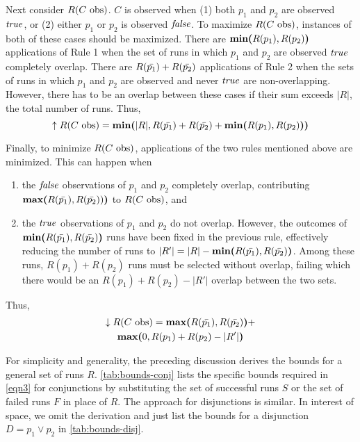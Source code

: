 Next consider $R(\text{$C$ obs})$.  $C$ is observed when (1) both $p_1$ and
$p_2$ are observed $\mathit{true}$, or (2) either $p_1$ or $p_2$ is observed
$\mathit{false}$.
To maximize $R(\text{$C$ obs})$, instances of both of these cases should be
maximized.
There are $\textbf{min(}R(p_1), R(p_2)\textbf{)}$ applications of Rule 1 when the set
of runs in which $p_1$ and $p_2$ are observed $\mathit{true}$ completely overlap.
There are $R(\text{$\bar{p_1}$}) + R(\text{$\bar{p_2}$})$ applications of Rule
2 when the sets of runs in which $p_1$ and $p_2$ are observed and never $\mathit{true}$ are
non-overlapping.
However, there has to be an overlap between these cases if their sum exceeds
$|R|$, the total number of runs.  Thus,
\begin{equation*}
  \uparrow R(\text{$C$ obs}) = \textbf{min(}|R|, R(\text{$\bar{p_1}$}) + R(\text{$\bar{p_2}$})
                   + \textbf{min(}R(p_1), R(p_2)\textbf{)}\textbf{)}
\end{equation*}

Finally, to minimize $R(\text{$C$ obs})$, applications of the two rules mentioned above are
minimized.  This can happen when
\begin{enumerate}
\item the $\mathit{false}$ observations of $p_1$ and $p_2$ completely overlap, contributing
$\textbf{max(}R(\text{$\bar{p_1}$}), R(\text{$\bar{p_2}$}))\textbf{)}$ to $R(\text{$C$ obs})$, and
\item the $\mathit{true}$ observations of $p_1$ and $p_2$ do not overlap.
However, the outcomes of $\textbf{min(}R(\text{$\bar{p_1}$}), R(\text{$\bar{p_2}$})\textbf{)}$ runs have
been fixed in the previous rule, effectively reducing the number of runs to
$|R'| = |R| - \textbf{min(}R(\text{$\bar{p_1}$}), R(\text{$\bar{p_2}$})\textbf{)}$.  Among these runs,
$R(p_1) + R(p_2)$
runs must be selected without overlap, failing which there would be an
$R(p_1) + R(p_2) - |R'|$ overlap
between the two sets.
\end{enumerate}

Thus,
\begin{multline*}
  \downarrow R(\text{$C$ obs}) = \textbf{max(}R(\text{$\bar{p_1}$}), R(\text{$\bar{p_2}$})\textbf{)} + \\
  \textbf{max(}0, R(p_1) + R(p_2) - |R'|\textbf{)}
\end{multline*}

For simplicity and generality, the preceding discussion derives the
bounds for a general set of runs $R$.  \autoref{tab:bounds-conj} lists
the specific bounds required in \autoref{eqn3} for conjunctions by
substituting the set of successful runs $S$ or the set of failed runs
$F$ in place of $R$.  The approach for disjunctions is similar.  In
interest of space, we omit the derivation and just list the bounds for
a disjunction $D = p_1 \vee p_2$ in \autoref{tab:bounds-disj}.


